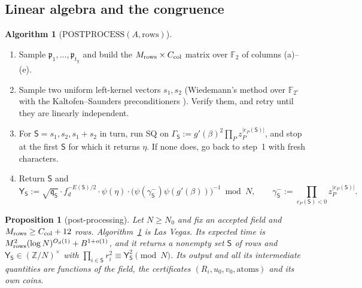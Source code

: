 \documentclass[11pt]{amsart}
\newtheorem{proposition}[theorem]{Proposition}
\theoremstyle{definition}
\newtheorem{algorithm}[theorem]{Algorithm}
\newcommand{\Z}{\mathbb{Z}}
\newcommand{\F}{\mathbb{F}}
\newcommand{\sS}{\mathsf{S}}
\newcommand{\sY}{\mathsf{Y}}
\newcommand{\fq}{\mathfrak{q}}
\newcommand{\fp}{\mathfrak{p}}
\begin{document}
\subsection{Linear algebra and the congruence}

\begin{algorithm}[$\mathrm{POSTPROCESS}(A,\text{rows})$]\label{alg:lv6}
\begin{enumerate}[label=\arabic*.]
\item Sample $\fp_1,\dots,\fp_{t_\chi}$ and build the $M_{\rm rows}\times C_{\rm col}$ matrix over $\F_2$ of columns (a)--(e).
\item Sample two uniform left-kernel vectors $s_1,s_2$ (Wiedemann's method over $\F_{2^e}$ with the Kaltofen--Saunders
  preconditioners \cite{wiedemann1986,kaltofensaunders1991}). Verify them, and retry until they are linearly independent.
\item For $\sS=s_1,s_2,s_1+s_2$ in turn, run SQ on $\Gamma_\sS:=g'(\beta)^2\prod_Pz_P^{|e_P(\sS)|}$, and stop at the first $\sS$ for which it returns $\eta$.
  If none does, go back to step~1 with fresh characters.
\item Return $\sS$ and
  \[
  \sY_\sS:=\sqrt{\fq_\sS}\cdot f_d^{-E(\sS)/2}\cdot\psi(\eta)\cdot\bigl(\psi(\gamma^-_\sS)\psi(g'(\beta))\bigr)^{-1}\bmod N,\qquad\gamma^-_\sS:=\prod_{e_P(\sS)<0}z_P^{|e_P(\sS)|}.
  \]
\end{enumerate}
\end{algorithm}

\begin{proposition}[post-processing]\label{prop:lv6}
Let $N\ge N_0$ and fix an accepted field and $M_{\rm rows}\ge C_{\rm col}+12$ rows. Algorithm~\ref{alg:lv6} is Las Vegas. Its expected time is
$M_{\rm rows}^2(\log N)^{O_d(1)}+B^{1+o(1)}$, and it returns a nonempty set $\sS$ of rows and $\sY_\sS\in(\Z/N)^\times$ with
$\prod_{i\in\sS}r_i^2\equiv\sY_\sS^2\pmod N$. Its output and all its intermediate quantities are functions of the field, the
certificates $(R_i,u_0,v_0,\text{atoms})$ and its own coins.
\end{proposition}
\end{document}
